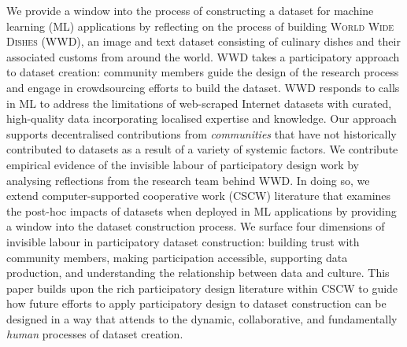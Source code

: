 We provide a window into the process of constructing a dataset for machine learning (ML) applications by reflecting on the process of building \textsc{World Wide Dishes (WWD)}, an image and text dataset consisting of culinary dishes and their associated customs from around the world. \textsc{WWD} takes a participatory approach to dataset creation: community members guide the design of the research process and engage in crowdsourcing efforts to build the dataset. \textsc{WWD} responds to calls in ML to address the limitations of web-scraped Internet datasets with curated, high-quality data incorporating localised expertise and knowledge. Our approach supports decentralised contributions from \textit{communities} that have not historically contributed to datasets as a result of a variety of systemic factors. We contribute empirical evidence of the invisible labour of participatory design work by analysing reflections from the research team behind \textsc{WWD}. In doing so, we extend computer-supported cooperative work (CSCW) literature that examines the post-hoc impacts of datasets when deployed in ML applications by providing a window into the dataset construction process. We surface four dimensions of invisible labour in participatory dataset construction: building trust with community members, making participation accessible, supporting data production, and understanding the relationship between data and culture. This paper builds upon the rich participatory design literature within CSCW to guide how future efforts to apply participatory design to dataset construction can be designed in a way that attends to the dynamic, collaborative, and fundamentally \textit{human} processes of dataset creation.  

